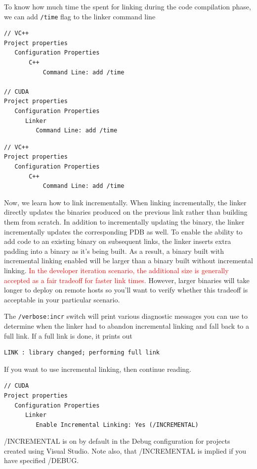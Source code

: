 To know how much time the spent for linking during the code compilation phase,
we can add \verb!/time! flag to the linker command line
\begin{verbatim}
// VC++
Project properties
   Configuration Properties 
       C++
           Command Line: add /time

// CUDA
Project properties
   Configuration Properties
      Linker
         Command Line: add /time             
\end{verbatim}


\begin{verbatim}
// VC++
Project properties
   Configuration Properties 
       C++
           Command Line: add /time

\end{verbatim}

Now, we learn how to link incrementally. When linking incrementally, the linker
directly updates the binaries produced on the previous link rather than building
them from scratch.  In addition to incrementally updating the binary, the linker
incrementally updates the corresponding PDB as well.
 To enable the ability to add code to an existing binary on subsequent links,
the linker inserts extra padding into a binary as it's being built. As a result,
a binary built with incremental linking enabled will be larger than a binary
built without incremental linking.  \textcolor{red}{In the developer iteration
scenario, the additional size is generally accepted as a fair tradeoff for
faster link times.} However, larger binaries will take longer to deploy on
remote hosts so you'll want to verify whether this tradeoff is acceptable in
your particular scenario. 

The \verb!/verbose:incr! switch will print various diagnostic messages you can
use to determine when the linker had to abandon incremental linking and fall back to a
full link. If a full link is done, it prints out
\begin{verbatim}
LINK : library changed; performing full link
\end{verbatim}

If you want to use incremental linking, then continue reading.
\begin{verbatim}
// CUDA
Project properties
   Configuration Properties
      Linker
         Enable Incremental Linking: Yes (/INCREMENTAL)
\end{verbatim}
/INCREMENTAL is on by default in the Debug configuration for projects created
using Visual Studio. Note also, that /INCREMENTAL is implied if you have
specified /DEBUG.


